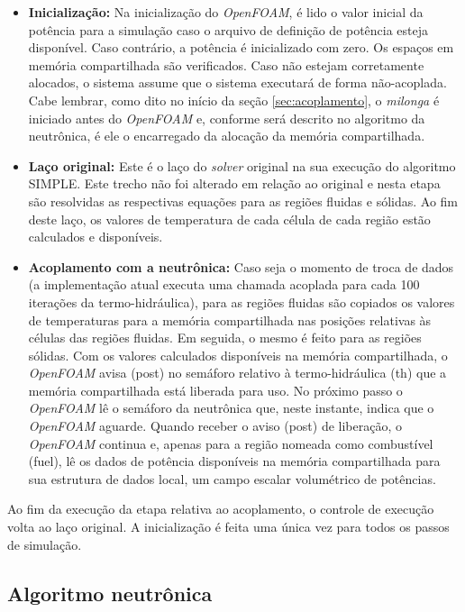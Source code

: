 \begin{itemize}
\item \textbf{Inicialização:} Na inicialização do \textit{OpenFOAM}, é lido o valor inicial da potência para
  a simulação caso o arquivo de definição de potência esteja disponível. Caso contrário, a potência é inicializado
  com zero. Os espaços em memória compartilhada são verificados. Caso não estejam corretamente alocados, o sistema
  assume que o sistema executará de forma não-acoplada. Cabe lembrar, como dito no início da seção \ref{sec:acoplamento},
  o \textit{milonga} é iniciado antes do \textit{OpenFOAM} e, conforme será descrito no algoritmo da neutrônica, é
  ele o encarregado da alocação da memória compartilhada.

\item \textbf{Laço original:} Este é o laço do \textit{solver} original na sua execução do algoritmo SIMPLE. Este
  trecho não foi alterado em relação ao original e nesta etapa são resolvidas as respectivas equações
  para as regiões fluidas e sólidas. Ao fim
  deste laço, os valores de temperatura de cada célula de cada região estão calculados e disponíveis.

\item \textbf{Acoplamento com a neutrônica:} Caso seja o momento de troca de dados (a implementação atual
  executa uma chamada acoplada para cada 100 iterações da termo-hidráulica), para as regiões fluidas são copiados os valores
  de temperaturas para a memória compartilhada nas posições relativas às células das regiões fluidas. Em seguida, o mesmo
  é feito para as regiões sólidas. Com os valores calculados disponíveis na memória compartilhada, o \textit{OpenFOAM}
  avisa (post) no semáforo relativo à termo-hidráulica (th) que a memória compartilhada está liberada para uso. No próximo
  passo o \textit{OpenFOAM} lê o semáforo da neutrônica que, neste instante, indica que o \textit{OpenFOAM} aguarde. Quando
  receber o aviso (post) de liberação, o \textit{OpenFOAM} continua e, apenas para a região nomeada como combustível (fuel),
  lê os dados de potência disponíveis na memória compartilhada para sua estrutura de dados local, um campo escalar volumétrico
  de potências.
\end{itemize}

Ao fim da execução da etapa relativa ao acoplamento, o controle de execução volta ao laço original. A inicialização é
feita uma única vez para todos os passos de simulação.

\subsection{Algoritmo neutrônica}

